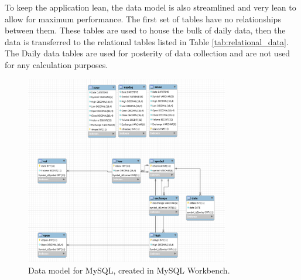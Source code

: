 \documentclass{IEEEtran}
\begin{document}
To keep the application lean, the data model is also streamlined and very lean to allow for maximum performance. The first set of tables have no relationships between them. These tables are used to house the bulk of daily data, then the data is transferred to the relational tables listed in Table \ref{tab:relational_data}. The Daily data tables are used for posterity of data collection and are not used for any calculation purposes. 

\begin{figure}
	\centering
	\includegraphics[width=3.5in]{Images/mysql_data_model.png}
	\caption{Data model for MySQL, created in MySQL Workbench.}
	\label{fig:mysql_model}
\end{figure}
\end{document}

